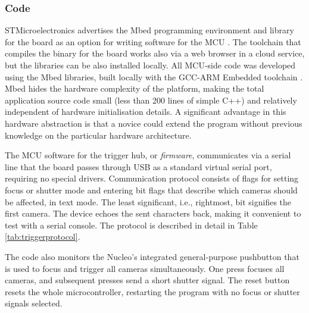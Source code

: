 

\subsubsection{Code}

STMicroelectronics advertises the Mbed programming environment and library for the board as an option for writing software for the MCU \cite{mbednucleo}.
The toolchain that compiles the binary for the board works also via a web browser in a cloud service, but the libraries can be also installed locally.
All MCU-side code was developed using the Mbed libraries, built locally with the GCC-ARM Embedded toolchain \cite{launchpad-gcc-arm}.
Mbed hides the hardware complexity of the platform, making the total application source code small (less than 200 lines of simple C++) and relatively independent of hardware initialisation details.
A significant advantage in this hardware abstraction is that a novice could extend the program without previous knowledge on the particular hardware architecture.

The MCU software for the trigger hub, or \emph{firmware}, communicates via a serial line that the board passes through USB as a standard virtual serial port, requiring no special drivers.
Communication protocol consists of flags for setting focus or shutter mode and entering bit flags that describe which cameras should be affected, in text mode.
The least significant, i.e., rightmost, bit signifies the first camera.
The device echoes the sent characters back, making it convenient to test with a serial console.
The protocol is described in detail in Table \ref{tab:triggerprotocol}.

The code also monitors the Nucleo's integrated general-purpose pushbutton that is used to focus and trigger all cameras simultaneously.
One press focuses all cameras, and subsequent presses send a short shutter signal.
The reset button resets the whole microcontroller, restarting the program with no focus or shutter signals selected.

